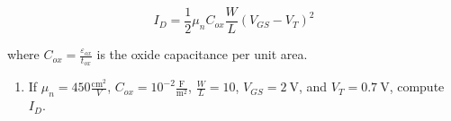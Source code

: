 \documentclass[fleqn]{article}
\begin{document}
\begin{enumerate}
		\begin{equation*}
			I_D = \frac{1}{2}{\mu_n}{C_{ox}}\frac{W}{L}(V_{GS}-V_{T})^2
		\end{equation*}
		
		where $C_{ox} = \frac{\varepsilon_{ox}}{t_{ox}}$ is the oxide capacitance per unit area.
		
		\begin{enumerate}
			\item If $\mu_n = 450 \frac{\text{cm}^2}{V}$, $C_{ox} = 10^{-2}\frac{\text{F}}{\text{m}^2}$, $\frac{W}{L} = 10$, $V_{GS} = 2\ \text{V}$, and $V_T = 0.7\ \text{V}$, compute $I_D$.
		\end{enumerate}
	\end{enumerate}
\end{document}
